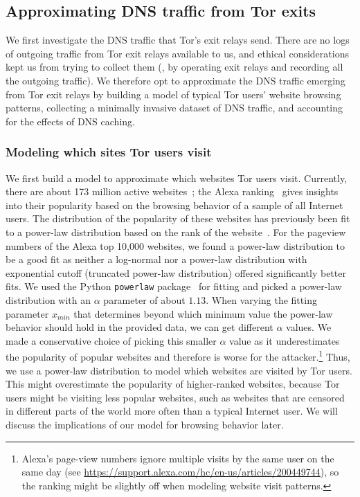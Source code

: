 \subsection{Approximating DNS traffic from Tor exits}
\label{sec:attack:sim}

We first investigate the DNS traffic that Tor's exit relays send.
There are no logs of outgoing traffic
from Tor exit relays available to us, and ethical considerations kept us
from trying to collect them (\eg, by operating exit relays and recording
all the outgoing traffic). We therefore opt to approximate the DNS traffic
emerging from Tor exit relays by \first building a model of typical Tor
users' website browsing patterns, \second collecting a minimally invasive
dataset of DNS traffic, and \third accounting for the effects of DNS caching.

\subsubsection{Modeling which sites Tor users visit}
\label{sec:attack:pop}

We first build a model to approximate {which websites} Tor users visit.
Currently, there are about 173 million active
websites~\cite{numberofwebsites}; the Alexa ranking~\cite{alexatop1k}
gives insights into their popularity based on the browsing behavior of
a sample of all Internet users. The distribution of the popularity of
these websites has previously been fit to a power-law distribution based
on the rank of the
website~\cite{Mahanti2013a,Clauset2009a,Ali2007a}.
For the pageview numbers of the Alexa top 10,000 websites, we found a
power-law distribution to be a good fit as neither a log-normal nor a
power-law distribution with exponential cutoff (truncated power-law
distribution) offered significantly better fits.
We used the Python {\tt powerlaw} package~\cite{Alstott2014a} for fitting and
picked a power-law distribution with an $\alpha$ parameter of about $1.13$.
When varying the fitting parameter $x_{min}$ that determines beyond which
minimum value the power-law behavior should hold in the provided data, we can
get different $\alpha$ values. We made a conservative choice of picking this
smaller $\alpha$ value as it underestimates the popularity of popular websites
and therefore is worse for the attacker.\footnote{Alexa's page-view numbers
ignore multiple visits by the same user on the same day (see
\url{https://support.alexa.com/hc/en-us/articles/200449744}), so the ranking
might be slightly off when modeling website visit patterns.}
Thus, we use a power-law distribution to model which websites are
visited by Tor users. This might overestimate the popularity of
higher-ranked websites, because Tor users might be visiting less popular
websites, such as websites that are censored in different parts of the
world more often than a typical Internet user. We will discuss the
implications of our model for browsing behavior later.

